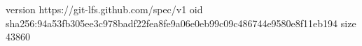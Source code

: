 version https://git-lfs.github.com/spec/v1
oid sha256:94a53fb305ee3c978badf22fea8fe9a06e0eb99c09c486744e9580e8f11eb194
size 43860
